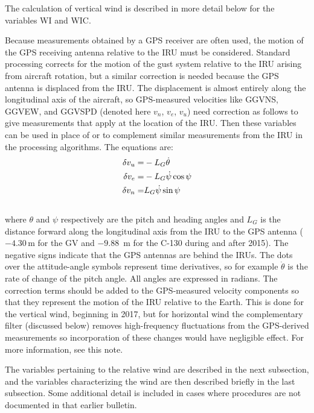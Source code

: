 \documentclass[
]{book}
\begin{document}
The calculation of vertical wind is described in more detail below for the variables WI and WIC.

Because measurements obtained by a GPS receiver are often used, the motion of the GPS receiving antenna relative to the IRU must be considered. Standard processing corrects for the motion of the gust system relative to the IRU arising from aircraft rotation, but a similar correction is needed because the GPS antenna is displaced from the IRU. The displacement is almost entirely along the longitudinal axis of the aircraft, so GPS-measured velocities like GGVNS, GGVEW, and GGVSPD (denoted here \(v_n\), \(v_e\), \(v_u\)) need correction as follows to give measurements that apply at the location of the IRU. Then these variables can be used in place of or to complement similar measurements from the IRU in the processing algorithms. The equations are:\\
\begin{align}\begin{split}
\delta v_{u} = & -L_{G}\dot{\theta}\notag \\
\delta v_{e} = & -L_{G}\dot{\psi}\,{\cos\psi}\notag \\
\delta v_{n} = &  L_{G}\dot{\psi}\,{\sin\psi}
\end{split}
\label{eq:deltav}
\end{align}\\
where \(\theta\) and \(\psi\) respectively are the pitch and heading angles and \(L_G\) is the distance forward along the longitudinal axis from the IRU to the GPS antenna (\(−4.30\) m for the GV and \(-9.88\)~m for the C-130 during and after 2015). The negative signs indicate that the GPS antennas are behind the IRUs. The dots over the attitude-angle symbols represent time derivatives, so for example \(\dot{\theta}\) is the rate of change of the pitch angle. All angles are expressed in radians. The correction terms should be added to the GPS-measured velocity components so that they represent the motion of the IRU relative to the Earth. This is done for the vertical wind, beginning in 2017, but for horizontal wind the complementary filter (discussed below) removes high-frequency fluctuations from the GPS-derived measurements so incorporation of these changes would have negligible effect. For more information, see this note.

The variables pertaining to the relative wind are described in the next subsection, and the variables characterizing the wind are then described briefly in the last subsection. Some additional detail is included in cases where procedures are not documented in that earlier bulletin.
\end{document}
